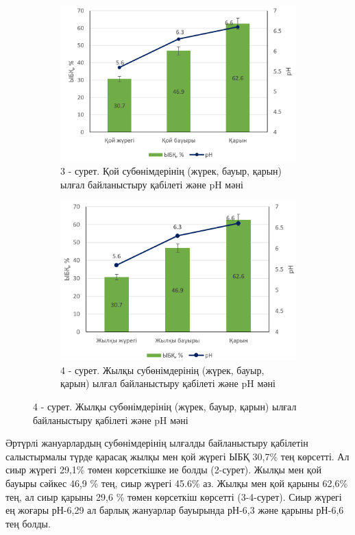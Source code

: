 \begin{figure}[H]
	\centering
	\begin{subfigure}{0.48\textwidth}
		\centering
		\includegraphics[width=\textwidth]{media/pish/image6}
		\caption*{3 - сурет. Қой субөнімдерінің (жүрек, бауыр, қарын) ылғал байланыстыру қабілеті және pH мәні}
	\end{subfigure}
	\begin{subfigure}{0.48\textwidth}
		\centering
		\includegraphics[width=\textwidth]{media/pish/image7}
		\caption*{4 - сурет. Жылқы субөнімдерінің (жүрек, бауыр, қарын) ылғал байланыстыру қабілеті және pH мәні}
	\end{subfigure}
\end{figure}

\begin{multicols}{2}
Әртүрлі жануарлардың субөнімдерінің ылғалды байланыстыру қабілетін
салыстырмалы түрде қарасақ жылқы мен қой жүрегі ЫБҚ 30,7\% тең көрсетті.
Ал сиыр жүрегі 29,1\% төмен көрсеткішке ие болды (2-сурет). Жылқы мен
қой бауыры сәйкес 46,9 \% тең, сиыр жүрегі 45.6\% аз. Жылқы мен қой
қарыны 62,6\% тең, ал сиыр қарыны 29,6 \% төмен көрсеткіш көрсетті
(3-4-сурет). Сиыр жүрегі ең жоғары рН-6,29 ал барлық жануарлар бауырында
рН-6,3 және қарыны рН-6,6 тең болды.
\end{multicols}


